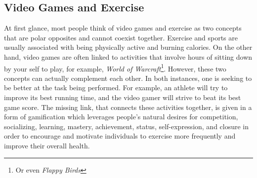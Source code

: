 \subsection{Video Games and Exercise}
At first glance, most people think of video games and exercise as two concepts that are polar opposites and cannot coexist together. Exercise and sports are usually associated with being physically active and burning calories. On the other hand, video games are often linked to activities that involve hours of sitting down by your self to play, for example, \textit{World of Warcraft}\footnote{Or even \textit{Flappy Birds}}. However, these two concepts can actually complement each other. In both instances, one is seeking to be better at the task being performed. For example, an athlete will try to improve its best running time, and the video gamer will strive to beat its best game score. The missing link, that connects these activities together, is given in a form of gamification which leverages people's natural desires for competition, socializing, learning, mastery, achievement, status, self-expression, and closure in order to encourage and motivate individuals to exercise more frequently and improve their overall health.
